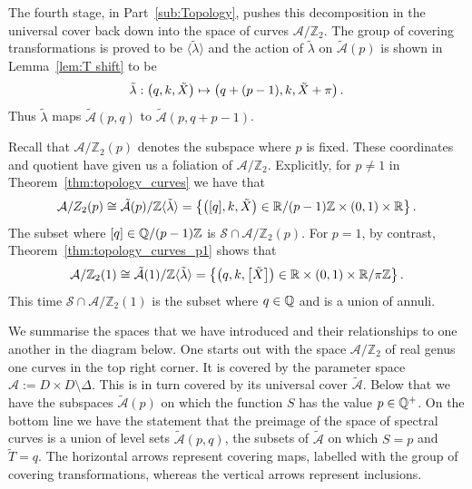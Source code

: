 \documentclass{article}
\begin{document}
The fourth stage, in Part~\ref{sub:Topology}, pushes this decomposition in the universal cover back down into the space of curves $\mathcal{A}/\mathbb{Z}_2$.
The group of covering transformations is proved to be $\langle \tilde{\lambda} \rangle$ and the action of $\tilde{\lambda}$ on $\mathcal{\tilde{A}}(p)$ is shown in Lemma~\ref{lem:T shift} to be
\[
\tilde{\lambda} : \left(q,k,\tilde{X}\right) \mapsto \left(q + (p-1),k,\tilde{X} + \pi\right).
\]
Thus $\tilde{\lambda}$ maps $\mathcal{\tilde{A}}(p,q)$ to $\mathcal{\tilde{A}}(p,q + p-1)$. 

Recall that $\mathcal{A}/\mathbb{Z}_2(p)$ denotes the subspace where $p$ is fixed. These coordinates and quotient have given us a foliation of $\mathcal{A}/\mathbb{Z}_2$. Explicitly, for $p\neq 1$ in Theorem~\ref{thm:topology_curves} we have that
\[
\mathcal{A}/Z_2(p)
\cong \mathcal{\tilde{A}}(p)/\mathbb{Z}\langle\tilde{\lambda}\rangle
= \left\{ \left([q],k,\tilde{X}\right) \in \mathbb{R}/(p-1)\mathbb{Z} \times (0,1) \times \mathbb{R} \right\}.
\]
The subset where $[q] \in \mathbb{Q}/(p-1)\mathbb{Z}$ is $\mathcal{S}\cap\mathcal{A}/\mathbb{Z}_2(p)$. 
For $p=1$, by contrast, Theorem~\ref{thm:topology_curves_p1} shows that
\[
\mathcal{A}/\mathbb{Z}_2(1)
\cong \mathcal{\tilde{A}}(1)/\mathbb{Z}\langle\tilde{\lambda}\rangle
= \left\{ \left(q,k,\left[\tilde{X}\right]\right) \in \mathbb{R} \times (0,1) \times \mathbb{R}/\pi\mathbb{Z} \right\}.
\]
This time $\mathcal{S}\cap\mathcal{A}/\mathbb{Z}_2(1)$ is the subset where $q\in\mathbb{Q}$ and is a union of annuli.

We summarise the spaces that we have introduced and their relationships to one another in the diagram below. One starts out with the space $\mathcal{A}/\mathbb{Z}_2$ of real genus one curves in the top right corner. It is covered by the parameter space $\mathcal{A} := D\times D \setminus\Delta$. This is in turn covered by its universal cover $\mathcal{\tilde{A}}$. Below that we have the subspaces $\mathcal{\tilde{A}}(p)$ on which the function $S$ has the value $p\in\mathbb{Q}^+$. On the bottom line we have the statement that the preimage of the space of spectral curves is a union of level sets $\mathcal{\tilde{A}}(p,q)$, the subsets of $\mathcal{\tilde{A}}$ on which $S = p$ and $\tilde{T} = q$. The horizontal arrows represent covering maps, labelled with the group of covering transformations, whereas the vertical arrows represent inclusions.
\end{document}
